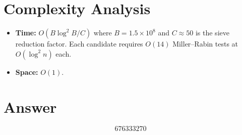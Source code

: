 \documentclass[12pt]{article}
\begin{document}
\section{Complexity Analysis}

\begin{itemize}
\item \textbf{Time:} $O(B \log^2 B / C)$ where $B = 1.5 \times 10^8$ and $C \approx 50$ is the sieve reduction factor. Each candidate requires $O(14)$ Miller--Rabin tests at $O(\log^2 n)$ each.
\item \textbf{Space:} $O(1)$.
\end{itemize}

\section{Answer}

\[
\boxed{676333270}
\]
\end{document}
